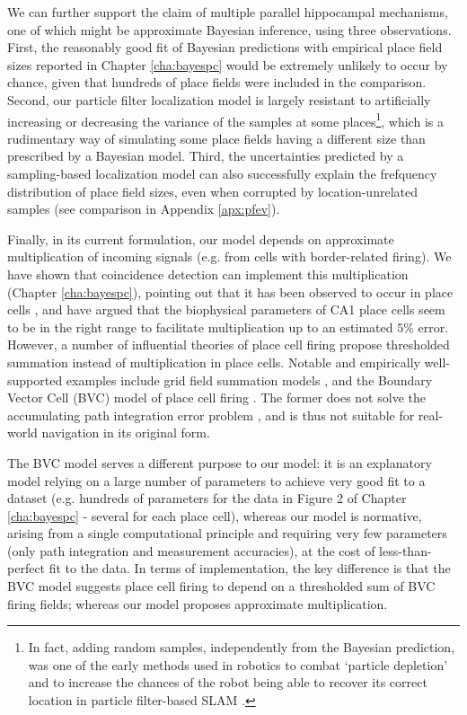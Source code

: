We can further support the claim of multiple parallel hippocampal mechanisms, one of which might be approximate Bayesian inference, using three observations. First, the reasonably good fit of Bayesian predictions with empirical place field sizes reported in Chapter \ref{cha:bayespc} would be extremely unlikely to occur by chance, given that hundreds of place fields were included in the comparison. Second, our particle filter localization model is largely resistant to artificially increasing or decreasing the variance of the samples at some places\footnote{In fact, adding random samples, independently from the Bayesian prediction, was one of the early methods used in robotics to combat `particle depletion' and to increase the chances of the robot being able to recover its correct location in particle filter-based SLAM \citep{thrun2005probabilistic}.}, which is a rudimentary way of simulating some place fields having a different size than prescribed by a Bayesian model. Third, the uncertainties predicted by a sampling-based localization model can also successfully explain the frefquency distribution of place field sizes, even when corrupted by location-unrelated samples (see comparison in Appendix \ref{apx:pfev}).

Finally, in its current formulation, our model depends on approximate multiplication of incoming signals (e.g. from cells with border-related firing). We have shown that coincidence detection can implement this multiplication (Chapter \ref{cha:bayespc}), pointing out that it has been observed to occur in place cells \citep{jarsky2005conditional, takahashi2009pathway}, and have argued that the biophysical parameters of CA1 place cells seem to be in the right range to facilitate multiplication up to an estimated $5\%$ error. However, a number of influential theories of place cell firing propose thresholded summation instead of multiplication in place cells. Notable and empirically well-supported examples include grid field summation models \citep{solstad2006grid}, and the Boundary Vector Cell (BVC) model of place cell firing \citep{hartley2000modeling, barry2006boundary}. The former does not solve the accumulating path integration error problem \citep{etienne1996path}, and is thus not suitable for real-world navigation in its original form. 

The BVC model serves a different purpose to our model: it is an explanatory model relying on a large number of parameters to achieve very good fit to a dataset (e.g. hundreds of parameters for the data in Figure 2 of Chapter \ref{cha:bayespc} - several for each place cell), whereas our model is normative, arising from a single computational principle and requiring very few parameters (only path integration and measurement accuracies), at the cost of less-than-perfect fit to the data. In terms of implementation, the key difference is that the BVC model suggests place cell firing to depend on a thresholded sum of BVC firing fields; whereas our model proposes approximate multiplication. 

